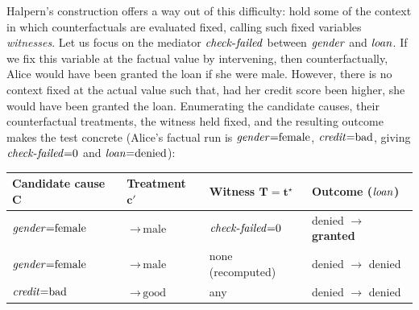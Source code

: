 Halpern's construction offers a way out of this difficulty: hold some of the context in which counterfactuals are evaluated fixed,
calling such fixed variables \emph{witnesses}.
Let us focus on the mediator $\varname{check\text{-}failed}$ between $\varname{gender}$ and $\varname{loan}$.
If we fix this variable at the factual value by intervening, then counterfactually, Alice would have been granted the loan if she were male.
However, there is no context fixed at the actual value such that, had her credit score been higher, she would have been granted the loan.
Enumerating the candidate causes, their counterfactual treatments, the witness held fixed, and the resulting outcome makes the test concrete (Alice's factual run is $\varname{gender}{=}\text{female}$, $\varname{credit}{=}\text{bad}$, giving $\varname{check\text{-}failed}{=}0$ and $\varname{loan}{=}\text{denied}$):

\begin{center}
\begin{tabular}{llll}
\toprule
Candidate cause $\mathbf{C}$ & Treatment $\mathbf{c}'$ & Witness $\mathbf{T}=\mathbf{t}^\star$
  & Outcome ($\varname{loan}$) \\
\midrule
$\varname{gender}{=}\text{female}$ & ${\to}\,\text{male}$ & $\varname{check\text{-}failed}{=}0$
  & denied $\to$ \textbf{granted} \\
$\varname{gender}{=}\text{female}$ & ${\to}\,\text{male}$ & none (recomputed)
  & denied $\to$ denied \\
$\varname{credit}{=}\text{bad}$    & ${\to}\,\text{good}$ & any
  & denied $\to$ denied \\
\bottomrule
\end{tabular}
\end{center}

